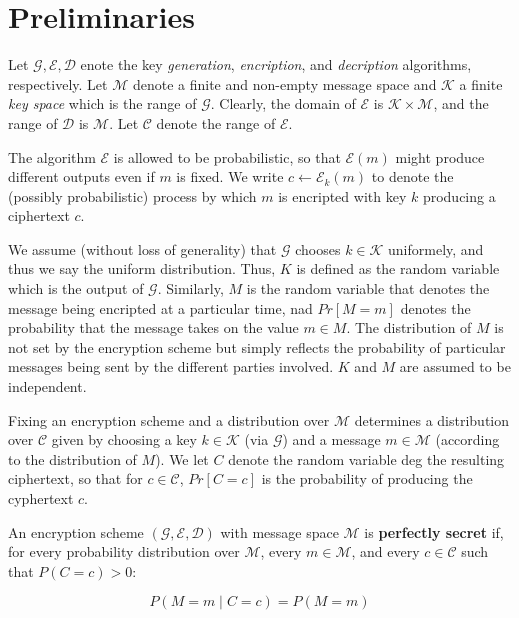 \documentclass[a4paper, 12pt]{article}
\begin{document}
\section{Preliminaries}
   
Let $\mathcal{G}, \mathcal{E}, \mathcal{D}$ enote the key \textit{generation},
\textit{encription}, and \textit{decription} algorithms, respectively. 
Let $\mathcal{M}$ denote a finite and non-empty message space 
and $\mathcal{K}$ a finite \textit{key space} which is the 
range of $\mathcal{G}$. Clearly, the domain 
of $\mathcal{E}$ is $\mathcal{K} \times \mathcal{M}$,
and the range of $\mathcal{D}$ is $\mathcal{M}$.
Let $\mathcal{C}$ denote the range of $\mathcal{E}$. 

The algorithm $\mathcal{E}$ is allowed to be probabilistic, so that 
$\mathcal{E}(m)$ might produce different outputs even if $m$
is fixed. We write $c \leftarrow \mathcal{E}_k(m)$ to denote the 
(possibly probabilistic) process by which $m$ is encripted 
with key $k$ producing a ciphertext $c$.

We assume (without loss of generality) that $\mathcal{G}$
chooses $k \in \mathcal{K}$ uniformely, and thus we say 
the uniform distribution. Thus, $K$ is defined as the 
random variable which is the output of $\mathcal{G}$.
Similarly, $M$ is the random variable that denotes the 
message being encripted at a particular time, nad 
$Pr\left[ M = m \right] $ denotes the probability 
that the message takes on the value $m \in M$.
The distribution of $M$ is not set by the encryption scheme 
but simply reflects the probability of particular messages being sent by the
different parties involved. $K$ and $M$ are assumed to be independent.

Fixing an encryption scheme and a distribution over $\mathcal{M}$
determines a distribution over $\mathcal{C}$ given by 
choosing a key $k \in \mathcal{K}$ (via $\mathcal{G}$) and 
a message $m \in \mathcal{M}$ (according to the distribution 
of $M$). We let $C$ denote the random variable de\not\in g the 
resulting ciphertext, so that for $c \in \mathcal{C}$, 
$Pr\left[ C = c \right] $ is the probability of producing 
the cyphertext $c$.

\begin{definition}
    An encryption scheme $(\mathcal{G}, \mathcal{E}, \mathcal{D})$ with message space 
    $\mathcal{M}$ is \textbf{perfectly secret} if, for 
    every probability distribution over $\mathcal{M}$, 
    every $m \in \mathcal{M}$, and every $c \in \mathcal{C}$ such that 
    $P(C = c) > 0$:

    \begin{equation*}
        P\left( M = m \mid C = c \right)  = P(M = m)
    \end{equation*}
\end{definition}
\end{document}
